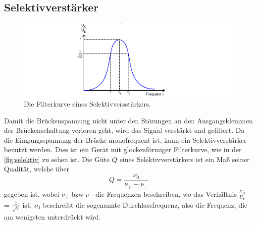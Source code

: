\subsection{Selektivverstärker}
\begin{figure}
    \centering
    \includegraphics[width=\textwidth]{content/filterkurve.png}
    \caption{Die Filterkurve eines Selektivversstärkers.\cite{anleitung}}
    \label{fig:selektiv}
\end{figure}
Damit die Brückenspannung nicht unter den Störungen an den Ausgangsklemmen der Brückenschaltung verloren geht, wird das Signal verstärkt und gefiltert.
Da die Eingangsspannung der Brücke monofrequent ist, kann ein Selektivverstärker benutzt werden. 
Dies ist ein Gerät mit glockenförmiger Filterkurve, wie in der \autoref{fig:selektiv} zu sehen ist.
Die Güte $Q$ eines Selektivverstärkers ist ein Maß seiner Qualität, welche über 
\begin{equation*}
    Q = \frac{\nu_0}{\nu_+ - \nu_-}
\end{equation*}
gegeben ist, wobei $\nu_+$ bzw $\nu_-$ die Frequenzen beschreiben, wo das Verhältnis $\frac{U_{\text{A}}}{U_{\text{E}}} $ = $\frac{1}{\sqrt{2}}$ ist.
$\nu_0$ beschreibt die sogenannte Durchlassfrequenz, also die Frequenz, die am wenigsten unterdrückt wird.